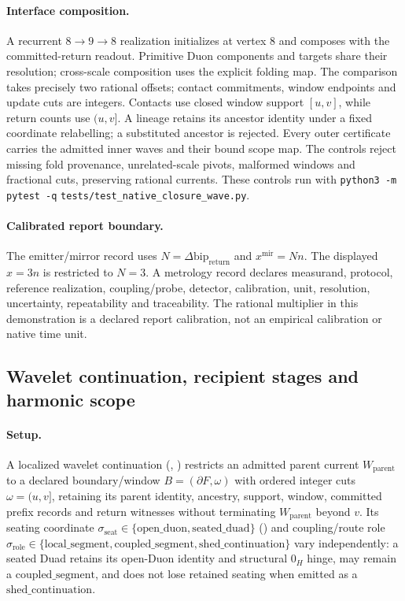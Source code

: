 \paragraph{Interface composition.}
A recurrent \(8\to9\to8\) realization initializes at vertex 8 and composes
with the committed-return readout. Primitive Duon components and targets share
their resolution; cross-scale composition uses the explicit folding map.
The comparison takes precisely two rational offsets; contact commitments,
window endpoints and update cuts are integers. Contacts use closed window
support \([u,v]\), while return counts use \((u,v]\). A lineage retains its ancestor identity
under a fixed coordinate relabelling; a substituted ancestor is rejected.
Every outer certificate carries the admitted inner waves and their bound
scope map. The controls reject missing fold provenance, unrelated-scale
pivots, malformed windows and fractional cuts, preserving rational currents.
These controls run with \texttt{python3 -m pytest -q}
\texttt{tests/test\_native\_closure\_wave.py}.

\paragraph{Calibrated report boundary.}
The emitter/mirror record uses \(N=\Delta\mathrm{bip}_{\mathrm{return}}\) and
\(x^{\mathrm{mir}}=Nn\). The displayed \(x=3n\) is restricted to \(N=3\).
A metrology record declares measurand, protocol, reference realization,
coupling/probe, detector, calibration, unit, resolution, uncertainty,
repeatability and traceability. The rational multiplier in this demonstration
is a declared report calibration, not an empirical calibration or native time unit.

\subsection{Wavelet continuation, recipient stages and harmonic scope}
\label{manual:wavelet-continuation-fixtures}

\paragraph{Setup.}
A localized wavelet continuation (,
) restricts an admitted parent
current \(W_{\mathrm{parent}}\) to a declared boundary/window
\(B=(\partial F,\omega)\) with ordered integer cuts \(\omega=(u,v]\), retaining
its parent identity, ancestry, support, window, committed prefix records and
return witnesses without terminating \(W_{\mathrm{parent}}\) beyond \(v\).
Its seating coordinate \(\sigma_{\mathrm{seat}}\in\{\mathrm{open\_duon},
\mathrm{seated\_duad}\}\) () and
coupling/route role \(\sigma_{\mathrm{role}}\in\{\mathrm{local\_segment},
\mathrm{coupled\_segment},\mathrm{shed\_continuation}\}\) vary independently:
a seated Duad retains its open-Duon identity and structural \(0_H\) hinge,
may remain a \(\mathrm{coupled\_segment}\), and does not lose retained seating
when emitted as a \(\mathrm{shed\_continuation}\).

